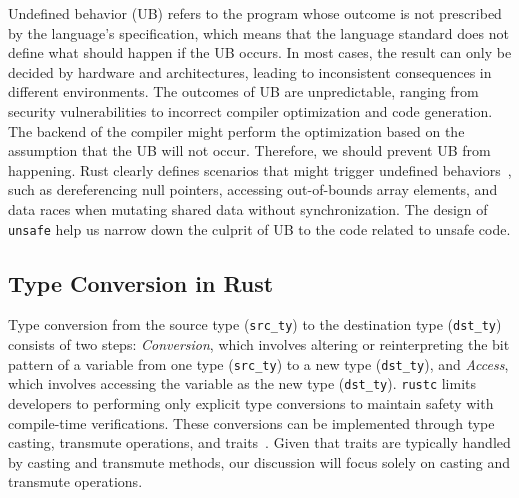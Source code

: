 \vspace{0.05in}
Undefined behavior (UB) refers to the program whose outcome is not prescribed by the language's specification, which means that the language standard does not define what should happen if the UB occurs. In most cases, the result can only be decided by hardware and architectures, leading to inconsistent consequences in different environments. The outcomes of UB are unpredictable, ranging from security vulnerabilities to incorrect compiler optimization and code generation. The backend of the compiler might perform the optimization based on the assumption that the UB will not occur. Therefore, we should prevent UB from happening. Rust clearly defines scenarios that might trigger undefined behaviors~\cite{ubreference}, such as dereferencing null pointers, accessing out-of-bounds array elements, and data races when mutating shared data without synchronization. The design of \texttt{unsafe} help us narrow down the culprit of UB to the code related to unsafe code.


\subsection{Type Conversion in Rust}
Type conversion from the source type (\texttt{src\_ty}) to the destination type (\texttt{dst\_ty}) consists of two steps: 
 {\it Conversion}, which involves altering or reinterpreting the bit pattern of a variable from one type (\texttt{src\_ty}) to a new type (\texttt{dst\_ty}), and  {\it Access}, which involves accessing the variable as the new type (\texttt{dst\_ty}).
\texttt{rustc} limits developers to performing only explicit type conversions to maintain safety with compile-time verifications. These conversions can be implemented through type casting, transmute operations, and traits~\cite{traits}. Given that traits are typically handled by casting and transmute methods, our discussion will focus solely on casting and transmute operations.



